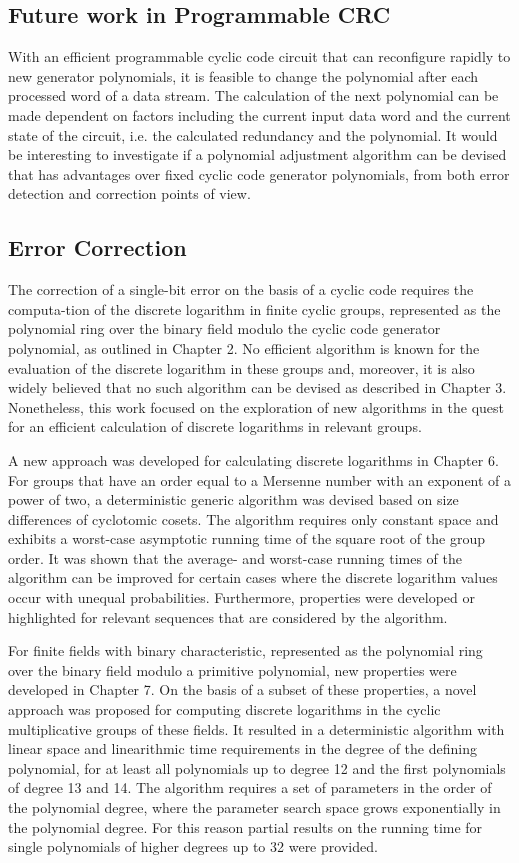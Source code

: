 \documentclass[oneside, a4paper, 11pt]{memoir}
\begin{document}
\subsection{Future work in Programmable CRC}
With an efficient programmable cyclic code circuit that can reconfigure rapidly to new generator polynomials, it is feasible to change the polynomial after each processed word of a data stream. The calculation of the next polynomial can be made dependent on factors including the current input data word and the current state of the circuit, i.e. the calculated redundancy and the polynomial. It would be interesting to investigate if a polynomial adjustment algorithm can be devised that has advantages over fixed cyclic code generator polynomials, from both error detection and correction points of view.

\subsection{Error Correction}
The correction of a single-bit error on the basis of a cyclic code requires the computa-tion of the discrete logarithm in finite cyclic groups, represented as the polynomial ring over the binary field modulo the cyclic code generator polynomial, as outlined in Chapter 2. No efficient algorithm is known for the evaluation of the discrete logarithm in these groups and, moreover, it is also widely believed that no such algorithm can be devised as described in Chapter 3. Nonetheless, this work focused on the exploration of new algorithms in the quest for an efficient calculation of discrete logarithms in relevant groups.

A new approach was developed for calculating discrete logarithms in Chapter 6. For groups that have an order equal to a Mersenne number with an exponent of a power of two, a deterministic generic algorithm was devised based on size differences of cyclotomic cosets. The algorithm requires only constant space and exhibits a worst-case asymptotic running time of the square root of the group order. It was shown that the average- and worst-case running times of the algorithm can be improved for certain cases where the discrete logarithm values occur with unequal probabilities. Furthermore, properties were developed or highlighted for relevant sequences that are considered by the algorithm.

For finite fields with binary characteristic, represented as the polynomial ring over the binary field modulo a primitive polynomial, new properties were developed in Chapter 7. On the basis of a subset of these properties, a novel approach was proposed for computing discrete logarithms in the cyclic multiplicative groups of these fields. It resulted in a deterministic algorithm with linear space and linearithmic time requirements in the degree of the defining polynomial, for at least all polynomials up to degree 12 and the first polynomials of degree 13 and 14. The algorithm requires a set of parameters in the order of the polynomial degree, where the parameter search space grows exponentially in the polynomial degree. For this reason partial results on the running time for single polynomials of higher degrees up to 32 were provided.
\end{document}
